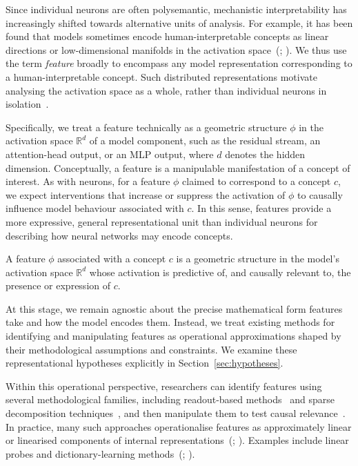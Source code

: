 Since individual neurons are often polysemantic, mechanistic interpretability has increasingly shifted towards alternative units of analysis. For example, it has been found that models sometimes encode human-interpretable concepts as linear directions or low-dimensional manifolds in the activation space~(; ). We thus use the term \emph{feature} broadly to encompass any model representation corresponding to a human-interpretable concept. Such distributed representations motivate analysing the activation space as a whole, rather than individual neurons in isolation~.

Specifically, we treat a feature technically as a geometric structure $\phi$ in the activation space $\mathbb{R}^d$ of a model component, such as the residual stream, an attention-head output, or an MLP output, where $d$ denotes the hidden dimension. Conceptually, a feature is a manipulable manifestation of a concept of interest. As with neurons, for a feature $\phi$ claimed to correspond to a concept $c$, we expect interventions that increase or suppress the activation of $\phi$ to causally influence model behaviour associated with $c$. In this sense, features provide a more expressive, general representational unit than individual neurons for describing how neural networks may encode concepts.

\begin{definitionbox}[Feature]
A feature $\phi$ associated with a concept $c$ is a geometric structure in the model's activation space $\mathbb{R}^d$ whose activation is predictive of, and causally relevant to, the presence or expression of $c$.
\end{definitionbox}


At this stage, we remain agnostic about the precise mathematical form features take and how the model encodes them. Instead, we treat existing methods for identifying and manipulating features as operational approximations shaped by their methodological assumptions and constraints. We examine these representational hypotheses explicitly in Section~\ref{sec:hypotheses}.

Within this operational perspective, researchers can identify features using several methodological families, including readout-based methods~ and sparse decomposition techniques~, and then manipulate them to test causal relevance~. In practice, many such approaches operationalise features as approximately linear or linearised components of internal representations~(; ). Examples include linear probes and dictionary-learning methods~(; ).

